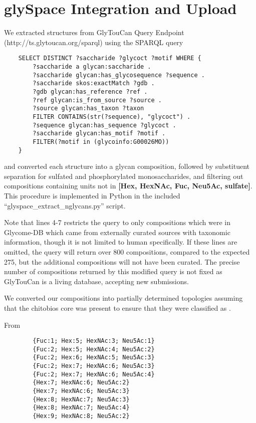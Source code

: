 
\section{glySpace Integration and Upload}\label{sec:glyspace_integration_and_upload}

    We extracted \nglycan structures from GlyTouCan Query Endpoint (http://ts.glytoucan.org/sparql) using the SPARQL query

    \begin{verbatim}
    SELECT DISTINCT ?saccharide ?glycoct ?motif WHERE {
        ?saccharide a glycan:saccharide .
        ?saccharide glycan:has_glycosequence ?sequence .
        ?saccharide skos:exactMatch ?gdb .
        ?gdb glycan:has_reference ?ref .
        ?ref glycan:is_from_source ?source .
        ?source glycan:has_taxon ?taxon
        FILTER CONTAINS(str(?sequence), "glycoct") .
        ?sequence glycan:has_sequence ?glycoct .
        ?saccharide glycan:has_motif ?motif .
        FILTER(?motif in (glycoinfo:G00026MO))
    }
    \end{verbatim} and converted each structure into a glycan composition, followed
    by substituent separation for sulfated and phosphorylated monosaccharides, and
    filtering out compositions containing units not in \textbf{[Hex, HexNAc, Fuc, Neu5Ac, sulfate]}.
    This procedure is implemented in Python in the included ``glyspace\_extract\_nglycans.py'' script.

    Note that lines 4-7 restricts the query to only compositions which were in Glycome-DB which came
    from externally curated sources with taxonomic information, though it is not limited to human \nglycans
    specifically. If these lines are omitted, the query will return over 800 compositions, compared to
    the expected 275, but the additional compositions will not have been curated. The precise number of
    compositions returned by this modified query is not fixed as GlyTouCan is a living database, accepting new
    submissions.

    We converted our \nglycan compositions into partially determined topologies
    assuming that the chitobios core was present to ensure that they were classified
    as \nglycans.

    From \rpserum
    \begin{verbatim}
        {Fuc:1; Hex:5; HexNAc:3; Neu5Ac:1}
        {Fuc:2; Hex:5; HexNAc:4; Neu5Ac:2}
        {Fuc:2; Hex:6; HexNAc:5; Neu5Ac:3}
        {Fuc:2; Hex:7; HexNAc:6; Neu5Ac:3}
        {Fuc:2; Hex:7; HexNAc:6; Neu5Ac:4}
        {Hex:7; HexNAc:6; Neu5Ac:2}
        {Hex:7; HexNAc:6; Neu5Ac:3}
        {Hex:8; HexNAc:7; Neu5Ac:3}
        {Hex:8; HexNAc:7; Neu5Ac:4}
        {Hex:9; HexNAc:8; Neu5Ac:2}
    \end{verbatim}

